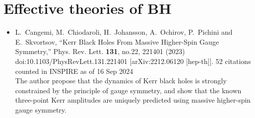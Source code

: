 \documentclass[a4paper,12pt]{article}
\begin{document}
\section*{Effective theories of BH}
\begin{itemize}
    \item %
    L.~Cangemi, M.~Chiodaroli, H.~Johansson, A.~Ochirov, P.~Pichini and E.~Skvortsov,
    ``Kerr Black Holes From Massive Higher-Spin Gauge Symmetry,''
    Phys. Rev. Lett. \textbf{131}, no.22, 221401 (2023)
    doi:10.1103/PhysRevLett.131.221401
    [arXiv:2212.06120 [hep-th]].
    52 citations counted in INSPIRE as of 16 Sep 2024\\
    The author propose that the dynamics of Kerr black holes is strongly constrained by the principle of
    gauge symmetry, and show that the known three-point Kerr amplitudes are uniquely
    predicted using massive higher-spin gauge symmetry.
\end{itemize}
\end{document}
